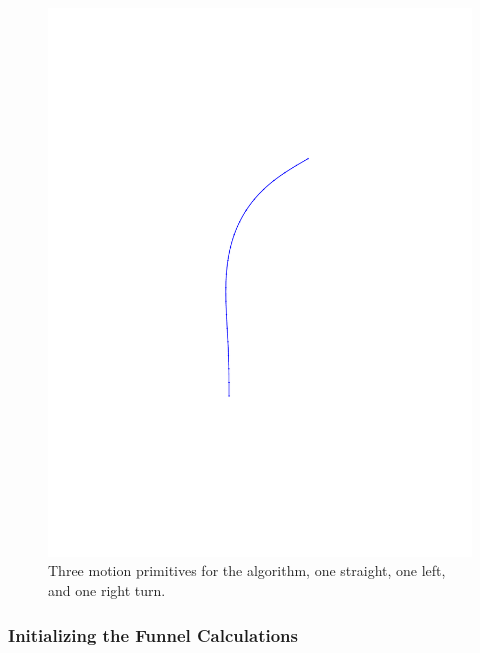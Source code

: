 \begin{figure}
\begin{minipage}[c]{0.3\textwidth}
    \includegraphics[trim={5cm 5cm 5cm 5cm},
    width=\textwidth]{figures/method/right-trajector}
  \end{minipage}
  \caption{Three motion primitives for the \rrtfunnel{} algorithm, one straight,
    one left, and one right turn.}
  \label{fig:initial-trajectories}
\end{figure}

\subsubsection{Initializing the Funnel Calculations}
\label{subsec:initializing-tvlqr}

